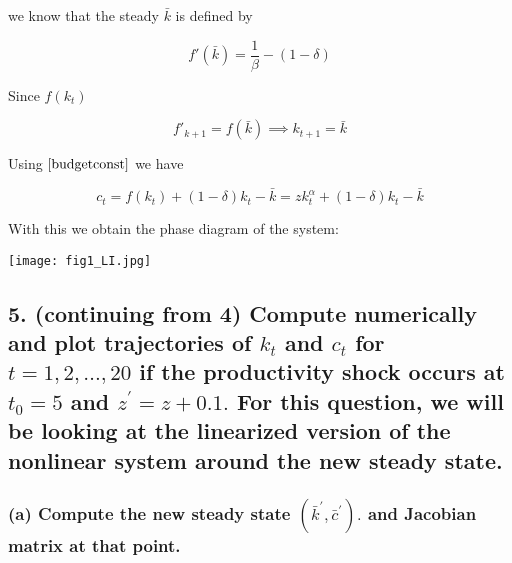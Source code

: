 \documentclass[10pt,notitlepage,onecolumn,aps,pra]{revtex4-1}
\makeatletter
\def\maxwidth{\ifdim\Gin@nat@width>\linewidth\linewidth
\else\Gin@nat@width\fi}
\let\Oldincludegraphics\includegraphics
\renewcommand{\includegraphics}[1]{\Oldincludegraphics[width=.8\maxwidth]{#1}}
\makeatother
\begin{document}
we know that the steady \(\bar{k}\) is defined by

\[f'(\bar{k}) = \frac{1}{\beta} - (1-\delta)\]

Since \(f(k_t)\)

\[f'_{k+1} = f(\bar{k}) \implies  k_{t+1} = \bar{k}\]

Using \(\eqref{budgetconst}\) we have

\[c_t = f(k_t)+(1-\delta)k_t-\bar{k} = z k_t^\alpha + (1-\delta)k_t-\bar{k}  \]

With this we obtain the phase diagram of the system:

    \texttt{[image: fig1\_LI.jpg]}

    \hypertarget{continuing-from-4-compute-numerically-and-plot-trajectories-of-k_t-and-c_t-for-t12-ldots-20-if-the-productivity-shock-occurs-at-t_05-and-zprimez0.1-.-for-this-question-we-will-be-looking-at-the-linearized-version-of-the-nonlinear-system-around-the-new-steady-state.}{%
\subsection{\texorpdfstring{5. (continuing from 4) Compute numerically
and plot trajectories of \(k_{t}\) and \(c_{t}\) for
\(t=1,2, \ldots, 20\) if the productivity shock occurs at \(t_{0}=5\)
and \(z^{\prime}=z+0.1 .\) For this question, we will be looking at the
linearized version of the nonlinear system around the new steady
state.}{5. (continuing from 4) Compute numerically and plot trajectories of k\_\{t\} and c\_\{t\} for t=1,2, \textbackslash ldots, 20 if the productivity shock occurs at t\_\{0\}=5 and z\^{}\{\textbackslash prime\}=z+0.1 . For this question, we will be looking at the linearized version of the nonlinear system around the new steady state.}}\label{continuing-from-4-compute-numerically-and-plot-trajectories-of-k_t-and-c_t-for-t12-ldots-20-if-the-productivity-shock-occurs-at-t_05-and-zprimez0.1-.-for-this-question-we-will-be-looking-at-the-linearized-version-of-the-nonlinear-system-around-the-new-steady-state.}}

\hypertarget{a-compute-the-new-steady-state-leftbarkprime-barcprimeright-.-and-jacobian-matrix-at-that-point.}{%
\subsubsection{\texorpdfstring{(a) Compute the new steady state
\(\left(\bar{k}^{\prime}, \bar{c}^{\prime}\right) .\) and Jacobian
matrix at that
point.}{(a) Compute the new steady state \textbackslash left(\textbackslash bar\{k\}\^{}\{\textbackslash prime\}, \textbackslash bar\{c\}\^{}\{\textbackslash prime\}\textbackslash right) . and Jacobian matrix at that point.}}\label{a-compute-the-new-steady-state-leftbarkprime-barcprimeright-.-and-jacobian-matrix-at-that-point.}}
\end{document}
